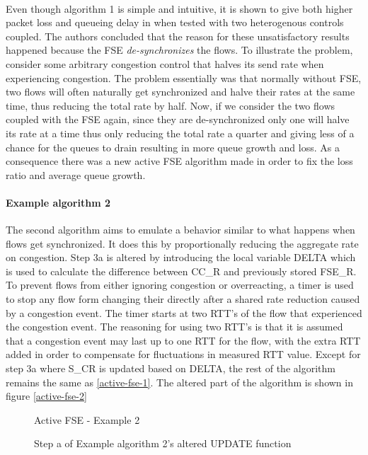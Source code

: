 \paragraph{}
Even though algorithm 1 is simple and intuitive, it is shown to give both higher packet loss and queueing delay in \cite{10.1145/2740070.2630089} when tested with two heterogenous controls coupled. 
The authors concluded that the reason for these unsatisfactory results happened because the FSE \textit{de-synchronizes} the flows.
To illustrate the problem, consider some arbitrary congestion control that halves its send rate when experiencing congestion.
The problem essentially was that normally without FSE, two flows will often naturally get synchronized and halve their rates at the same time, thus reducing the total rate by half.
Now, if we consider the two flows coupled with the FSE again, since they are de-synchronized only one will halve its rate at a time thus only reducing the total rate a quarter and giving less of a chance for the queues to drain resulting in more queue growth and loss.
As a consequence there was a new active FSE algorithm made in order to fix the loss ratio and average queue growth.
\paragraph{Example algorithm 2}
The second algorithm aims to emulate a behavior similar to what happens when flows get synchronized.
It does this by proportionally reducing the aggregate rate on congestion.
Step 3a is altered by introducing the local variable DELTA which is used to calculate the difference between CC\_R and previously stored FSE\_R. 
To prevent flows from either ignoring congestion or overreacting, a timer is used to stop any flow form changing their directly after a shared rate reduction caused by a congestion event. 
The timer starts at two RTT's of the flow that experienced the congestion event.
The reasoning for using two RTT's is that it is assumed that a congestion event may last up to one RTT for the flow, with the extra RTT added in order to compensate for fluctuations in measured RTT value.
Except for step 3a where S\_CR is updated based on DELTA, the rest of the algorithm remains the same as \vref{active-fse-1}.
The altered part of the algorithm is shown in figure \vref{active-fse-2}

\begin{figure}
\begin{algorithm}[H]
    \SetAlgoLined
    \caption{Active FSE - Example 2}
\end{algorithm}
\caption{Step a of Example algorithm 2's altered UPDATE function}
\label{active-fse-2}
\end{figure}

